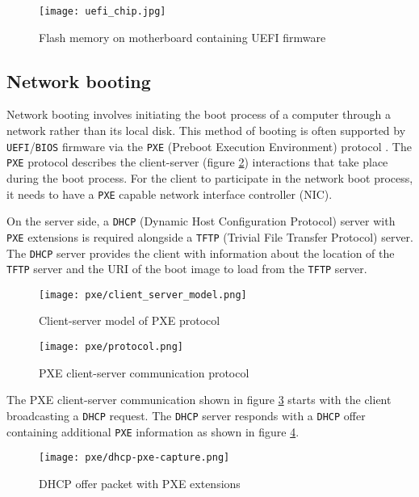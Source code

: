 \documentclass[../main.tex]{subfiles}
\begin{document}
\begin{figure}[H]
  \centering
  \texttt{[image: uefi\_chip.jpg]}
  \caption{Flash memory on motherboard containing UEFI firmware \cite{uefi_chip_img_ref}}
  \label{fig:uefi_chip}
\end{figure}

\subsection{Network booting}

Network booting involves initiating the boot process of a computer through a network rather than its local disk.
This method of booting is often supported by \texttt{UEFI}/\texttt{BIOS} firmware via the
\texttt{PXE} (Preboot Execution Environment) protocol \cite{pxespec}. The \texttt{PXE} protocol
describes the client-server (figure \ref{fig:pxe_client_server_model}) interactions that take place during the boot process.
For the client to participate in the network boot process, it needs to have a \texttt{PXE} capable network interface controller (NIC).

On the server side, a \texttt{DHCP} (Dynamic Host Configuration Protocol) server with \texttt{PXE} extensions is required
alongside a \texttt{TFTP} (Trivial File Transfer Protocol) server. The \texttt{DHCP} server provides the client with
information about the location of the \texttt{TFTP} server and the URI of the boot image to load from the \texttt{TFTP} server.

\begin{figure}[H]
  \centering
  \texttt{[image: pxe/client\_server\_model.png]}
  \caption{Client-server model of PXE protocol \cite{pxespec}}
  \label{fig:pxe_client_server_model}
\end{figure}

\begin{figure}[H]
  \centering
  \texttt{[image: pxe/protocol.png]}
  \caption{PXE client-server communication protocol \cite{pxespec_protocol}}
  \label{fig:pxe_protocol}
\end{figure}

The PXE client-server communication shown in figure \ref{fig:pxe_protocol} starts with the client
broadcasting a \texttt{DHCP} request. The \texttt{DHCP} server responds with a \texttt{DHCP} offer
containing additional \texttt{PXE} information as shown in figure \ref{fig:pxe_dhcp_offer}.

\begin{figure}[H]
  \centering
  \texttt{[image: pxe/dhcp-pxe-capture.png]}
  \caption{DHCP offer packet with PXE extensions \cite{pxespec_dhcp_options}}
  \label{fig:pxe_dhcp_offer}
\end{figure}
\end{document}
